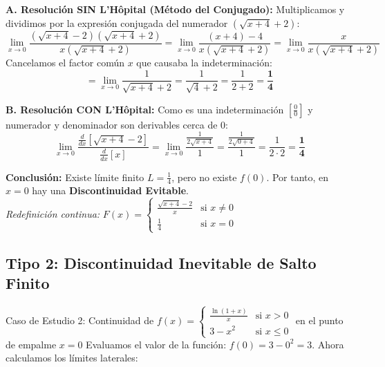\documentclass[10pt,a4paper]{article}
\begin{document}
\textbf{A. Resolución SIN L'Hôpital (Método del Conjugado):}
Multiplicamos y dividimos por la expresión conjugada del numerador $(\sqrt{x+4} + 2)$:
$$\lim_{x \to 0} \frac{(\sqrt{x+4} - 2)(\sqrt{x+4} + 2)}{x(\sqrt{x+4} + 2)} = \lim_{x \to 0} \frac{(x+4) - 4}{x(\sqrt{x+4} + 2)} = \lim_{x \to 0} \frac{x}{x(\sqrt{x+4} + 2)}$$
Cancelamos el factor común $x$ que causaba la indeterminación:
$$= \lim_{x \to 0} \frac{1}{\sqrt{x+4} + 2} = \frac{1}{\sqrt{4} + 2} = \frac{1}{2 + 2} = \mathbf{\frac{1}{4}}$$

\textbf{B. Resolución CON L'Hôpital:}
Como es una indeterminación $\left[\frac{0}{0}\right]$ y numerador y denominador son derivables cerca de $0$:
$$\lim_{x \to 0} \frac{\frac{d}{dx}[\sqrt{x+4} - 2]}{\frac{d}{dx}[x]} = \lim_{x \to 0} \frac{\frac{1}{2\sqrt{x+4}}}{1} = \frac{\frac{1}{2\sqrt{0+4}}}{1} = \frac{1}{2 \cdot 2} = \mathbf{\frac{1}{4}}$$

\textbf{Conclusión:} Existe límite finito $L = \frac{1}{4}$, pero no existe $f(0)$. Por tanto, en $x = 0$ hay una \textbf{Discontinuidad Evitable}.\\
\textit{Redefinición continua:} $F(x) = \begin{cases} \frac{\sqrt{x+4}-2}{x} & \text{si } x \neq 0 \\ \frac{1}{4} & \text{si } x = 0 \end{cases}$

\vspace{3mm}

\subsection{Tipo 2: Discontinuidad Inevitable de Salto Finito}

\begin{ejemplobox}{Caso de Estudio 2: Continuidad de $f(x) = \begin{cases} \frac{\ln(1+x)}{x} & \text{si } x > 0 \\ 3 - x^2 & \text{si } x \le 0 \end{cases}$ en el punto de empalme $x = 0$}
Evaluamos el valor de la función: $f(0) = 3 - 0^2 = 3$. Ahora calculamos los límites laterales:
\end{ejemplobox}
\end{document}
